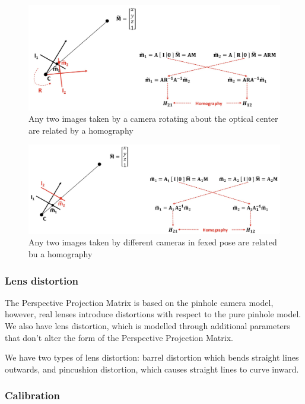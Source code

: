 \begin{figure}[htbp]
  \centering
  \includegraphics[width=0.8\linewidth]{./img/rotating_homography.jpg}
  \caption{Any two images taken by a camera rotating about the optical center are related by a homography}
  \label{fig:rotating_homography}
\end{figure}

\begin{figure}[htbp]
  \centering
  \includegraphics[width=0.8\linewidth]{./img/moving_homography.jpg}
  \caption{Any two images taken by different cameras in fexed pose are related bu a homography}
  \label{fig:moving_homography}
\end{figure}

\subsubsection{Lens distortion}

The Perspective Projection Matrix is based on the pinhole camera model, however, real lenses introduce distortions with respect to the pure pinhole model.
We also have lens distortion, which is modelled through additional parameters that don't alter the form of the Perspective Projection Matrix.

We have two types of lens distortion: barrel distortion which bends straight lines outwards, and pincushion distortion, which causes straight lines to curve inward.

\subsubsection{Calibration}

